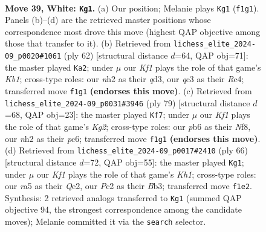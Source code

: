 \documentclass[11pt]{article}
\begin{document}
\clearpage

\begin{figure}[p]\centering
\begin{subfigure}{0.46\textwidth}\centering
\resizebox{\linewidth}{!}{%
\newchessgame
\chessboard[
  setfen={2r3k1/3n2p1/1p6/r2p3Q/P3p2N/2q5/2P2P1n/R2R1K2 w - - 0 39},
  showmover=false,
  pgfstyle=straightmove, color=movearrow, markmove={f1-g1}
]}
\caption{}
\end{subfigure}\hfill
\begin{subfigure}{0.46\textwidth}\centering
\resizebox{\linewidth}{!}{%
\newchessgame
\chessboard[
  setfen={1r2r1k1/5p2/6p1/2Q2p1p/2R2P1P/P2q4/1P6/1KR5 w - - 3 32},
  showmover=false,
  pgfstyle=straightmove, color=movearrow, markmove={b1-a2}
]}
\caption{}
\end{subfigure}
\\[4pt]
\begin{subfigure}{0.46\textwidth}\centering
\resizebox{\linewidth}{!}{%
\newchessgame
\chessboard[
  setfen={1q1r1n2/6k1/p1P2Np1/3P4/3B1P1r/6R1/P5Qp/3R3K b - - 2 40},
  showmover=false,
  pgfstyle=straightmove, color=movearrow, markmove={g7-f7}
]}
\caption{}
\end{subfigure}\hfill
\begin{subfigure}{0.46\textwidth}\centering
\resizebox{\linewidth}{!}{%
\newchessgame
\chessboard[
  setfen={4r1k1/pp3p1p/6p1/4r1P1/4q3/PB2n3/1P2Q2P/1R2R2K w - - 6 34},
  showmover=false,
  pgfstyle=straightmove, color=movearrow, markmove={h1-g1}
]}
\caption{}
\end{subfigure}
\caption{\textbf{Move 39, White: \texttt{Kg1}.} (a) Our position; Melanie plays \texttt{Kg1} (\texttt{f1g1}). Panels (b)--(d) are the retrieved master positions whose correspondence most drove this move (highest QAP objective among those that transfer to it). (b) Retrieved from \texttt{lichess\_elite\_2024-09\_p0020\#1061} (ply 62) [structural distance $d$=64, QAP obj=71]: the master played \texttt{Ka2}; under $\mu$ our \emph{Kf1} plays the role of that game's \emph{Kb1}; cross-type roles: our \emph{n}h2 as their \emph{q}d3, our \emph{q}c3 as their \emph{R}c4; transferred move \texttt{f1g1} \textbf{(endorses this move)}. (c) Retrieved from \texttt{lichess\_elite\_2024-09\_p0031\#3946} (ply 79) [structural distance $d$=68, QAP obj=23]: the master played \texttt{Kf7}; under $\mu$ our \emph{Kf1} plays the role of that game's \emph{Kg2}; cross-type roles: our \emph{p}b6 as their \emph{N}f8, our \emph{n}h2 as their \emph{p}c6; transferred move \texttt{f1g1} \textbf{(endorses this move)}. (d) Retrieved from \texttt{lichess\_elite\_2024-09\_p0017\#2410} (ply 66) [structural distance $d$=72, QAP obj=55]: the master played \texttt{Kg1}; under $\mu$ our \emph{Kf1} plays the role of that game's \emph{Kh1}; cross-type roles: our \emph{r}a5 as their \emph{Q}e2, our \emph{P}c2 as their \emph{B}b3; transferred move \texttt{f1e2}. Synthesis: 2 retrieved analogs transferred to \texttt{Kg1} (summed QAP objective 94, the strongest correspondence among the candidate moves); Melanie committed it via the \texttt{search} selector.}
\label{fig:thought-m76}
\end{figure}
\end{document}
